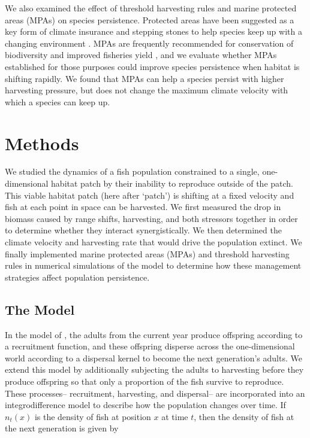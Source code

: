 \documentclass[12pt,english]{article}
\begin{document}
We also examined the effect of threshold harvesting rules and marine protected areas (MPAs) on species persistence. Protected areas have been suggested as a key form of climate insurance and stepping stones to help species keep up with a changing environment \citep{Thomasetal2012, Hannahetal2007}. MPAs are frequently recommended for conservation of biodiversity and improved fisheries yield \citep{Gainesetal2010}, and we evaluate whether MPAs established for those purposes could improve species persistence when habitat is shifting rapidly. We found that MPAs can help a species persist with higher harvesting pressure, but does not change the maximum climate velocity with which a species can keep up.

\section{Methods}

We studied the dynamics of a fish population constrained to a single, one-dimensional habitat patch by their inability to reproduce outside of the patch.  This viable habitat patch (here after `patch') is shifting at a fixed velocity and fish at each point in space can be harvested.  We first measured the drop in biomass caused by range shifts, harvesting, and both stressors together in order to determine whether they interact synergistically.  We then determined the climate velocity and harvesting rate that would drive the population extinct.  We finally implemented marine protected areas (MPAs) and threshold harvesting rules in numerical simulations of the model to determine how these management strategies affect population persistence.

\subsection{The Model }

In the model of \cite{ZhouKot2011}, the adults from the current year produce offspring according to a recruitment function, and these offspring disperse across the one-dimensional world according to a dispersal kernel to become the next generation's adults.  We extend this model by additionally subjecting the adults to harvesting before they produce offspring so that only a proportion of the fish survive to reproduce. These processes-- recruitment, harvesting, and dispersal-- are incorporated into an integrodifference model to describe how the population changes over time. If $n_t(x)$ 
is the density of fish at position $x$ at time $t$, then the density of fish at the next generation is given by
\end{document}
